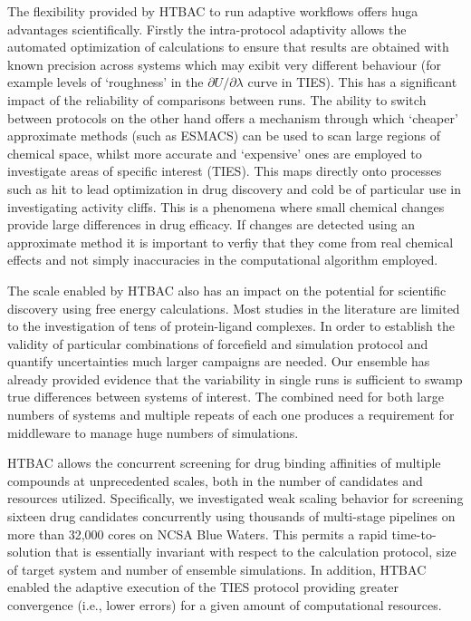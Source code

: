 \documentclass[conference]{IEEEtran}
\begin{document}
The flexibility provided by HTBAC to run adaptive workflows offers huga advantages scientifically. 
Firstly the intra-protocol adaptivity allows the automated optimization of calculations to ensure that 
results are obtained with known precision across systems which may exibit very different behaviour (for example levels of `roughness' in the $\partial U/\partial\lambda$ curve in TIES).
This has a significant impact of the reliability of comparisons between runs. 
The ability to switch between protocols on the other hand offers a mechanism through which `cheaper' approximate methods (such as ESMACS) can be used to scan large regions of chemical space, whilst more accurate and `expensive' ones are employed to investigate areas of specific interest (TIES).
This maps directly onto processes such as hit to lead optimization in drug discovery and cold be of particular use in investigating activity cliffs. 
This is a phenomena where small chemical changes provide large differences in drug efficacy.
If changes are detected using an approximate method it is important to verfiy that they come from 
real chemical effects and not simply inaccuracies in the computational algorithm employed.

The scale enabled by HTBAC also has an impact on the potential for scientific discovery using free energy calculations. 
Most studies in the literature are limited to the investigation of tens of protein-ligand complexes.
In order to establish the validity of particular combinations of forcefield and simulation protocol and 
quantify uncertainties much larger campaigns are needed.
Our ensemble has already provided evidence that the variability in single runs is sufficient to 
swamp true differences between systems of interest.
The combined need for both large numbers of systems and multiple repeats of each one produces a requirement 
for middleware to manage huge numbers of simulations.

HTBAC allows the concurrent screening
for drug binding affinities of multiple compounds at unprecedented scales,
both in the number of candidates and resources utilized. Specifically, we
investigated weak scaling behavior for screening sixteen drug candidates
concurrently using thousands of multi-stage pipelines on more than 32,000
cores on NCSA Blue Waters. This permits a rapid time-to-solution that is 
essentially invariant with respect to the calculation protocol, 
size of target system and number of ensemble simulations. In addition,
HTBAC enabled the adaptive execution of the TIES protocol
providing greater convergence (i.e., lower errors) for a given amount of
computational resources. 
\end{document}
